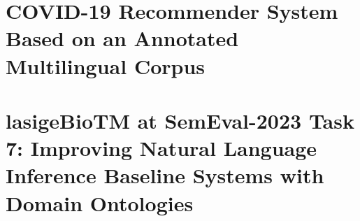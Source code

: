 \hypertarget{AH}{\chapter{COVID-19 Recommender System Based on an Annotated Multilingual Corpus}}


\hypertarget{AI}{\chapter{lasigeBioTM at SemEval-2023 Task 7: Improving Natural Language Inference Baseline Systems with Domain Ontologies}}


% 